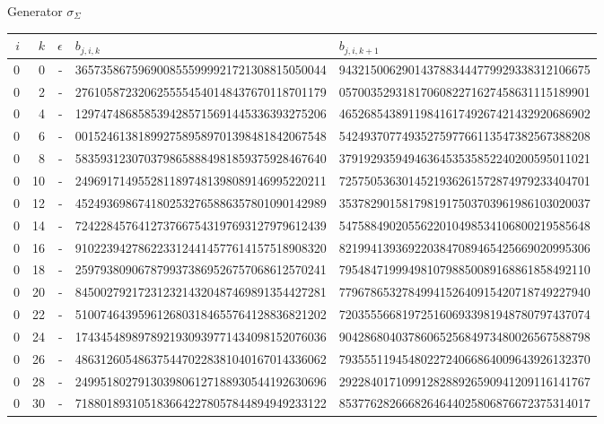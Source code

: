 \par\medskip\normalfont\normalsize Generator $\sigma_{\Sigma}$\par\smallskip
\fontsize{7.6}{9.2}\selectfont\ttfamily
\begin{longtable}{rrrll}
$i$ & $k$ & $\epsilon$ & $b_{j,i,k}$ & $b_{j,i,k+1}$ \\ \hline\endhead
0 & 0 & - & 3657358675969008555999921721308815050044 & 9432150062901437883444779929338312106675 \\
0 & 2 & - & 2761058723206255554540148437670118701179 & 0570035293181706082271627458631115189901 \\
0 & 4 & - & 1297474868585394285715691445336393275206 & 4652685438911984161749267421432920686902 \\
0 & 6 & - & 0015246138189927589589701398481842067548 & 5424937077493527597766113547382567388208 \\
0 & 8 & - & 5835931230703798658884981859375928467640 & 3791929359494636453535852240200595011021 \\
0 & 10 & - & 2496917149552811897481398089146995220211 & 7257505363014521936261572874979233404701 \\
0 & 12 & - & 4524936986741802532765886357801090142989 & 3537829015817981917503703961986103020037 \\
0 & 14 & - & 7242284576412737667543197693127979612439 & 5475884902055622010498534106800219585648 \\
0 & 16 & - & 9102239427862233124414577614157518908320 & 8219941393692203847089465425669020995306 \\
0 & 18 & - & 2597938090678799373869526757068612570241 & 7954847199949810798850089168861858492110 \\
0 & 20 & - & 8450027921723123214320487469891354427281 & 7796786532784994152640915420718749227940 \\
0 & 22 & - & 5100746439596126803184655764128836821202 & 7203555668197251606933981948780797437074 \\
0 & 24 & - & 1743454898978921930939771434098152076036 & 9042868040378606525684973480026567588798 \\
0 & 26 & - & 4863126054863754470228381040167014336062 & 7935551194548022724066864009643926132370 \\
0 & 28 & - & 2499518027913039806127188930544192630696 & 2922840171099128288926590941209116141767 \\
0 & 30 & - & 7188018931051836642278057844894949233122 & 8537762826668264644025806876672375314017 \\

\end{longtable}
